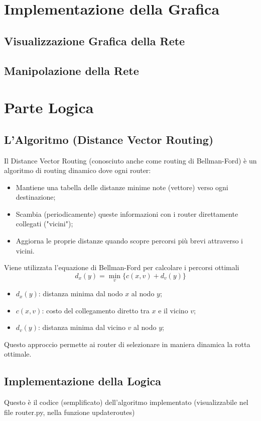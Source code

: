 \documentclass[a4paper,12pt]{report}
\begin{document}
\newpage
\section{Implementazione della Grafica}
\subsection{Visualizzazione Grafica della Rete}
\subsection{Manipolazione della Rete}

\newpage
\section{Parte Logica}
\subsection{L'Algoritmo (Distance Vector Routing)}
Il Distance Vector Routing (conosciuto anche come routing di Bellman-Ford) è un algoritmo di routing dinamico dove ogni router:
\begin{itemize}
    \item Mantiene una tabella delle distanze minime note (vettore) verso ogni destinazione;
    \item Scambia (periodicamente) queste informazioni con i router direttamente collegati ("vicini");
    \item Aggiorna le proprie distanze quando scopre percorsi più brevi attraverso i vicini.
\end{itemize}

\noindent Viene utilizzata l'equazione di Bellman-Ford per calcolare i percorsi ottimali
\[ d_x(y) = \min_v\{c(x,v) + d_v(y)\} \]
\begin{itemize}
    \item $d_x(y)$: distanza minima dal nodo $x$ al nodo $y$;
    \item $c(x,v)$: costo del collegamento diretto tra $x$ e il vicino $v$;
    \item $d_v(y)$: distanza minima dal vicino $v$ al nodo $y$;
\end{itemize}

\noindent Questo approccio permette ai router di selezionare in maniera dinamica la rotta ottimale.
\newpage
\subsection{Implementazione della Logica}
Questo è il codice (semplificato) dell'algoritmo implementato (visualizzabile nel file router.py, nella funzione updateroutes)
\end{document}
